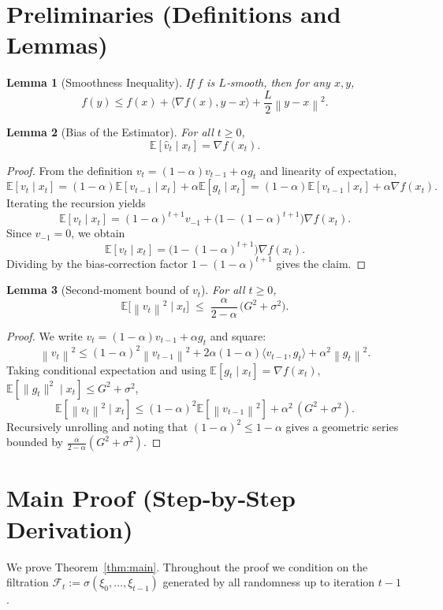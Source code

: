 \documentclass{article}
\newtheorem{lemma}{Lemma}
\newcommand{\E}{\mathbb{E}}
\newcommand{\norm}[1]{\left\lVert#1\right\rVert}
\begin{document}
\section*{Preliminaries (Definitions and Lemmas)}
\begin{lemma}[Smoothness Inequality]\label{lem:smooth}
If $f$ is $L$‑smooth, then for any $x,y$,
\[
f(y)\le f(x)+\langle\nabla f(x),y-x\rangle+\frac{L}{2}\norm{y-x}^2 .
\]
\end{lemma}
\begin{lemma}[Bias of the Estimator]\label{lem:bias}
For all $t\ge0$,
\[
\E[\hat v_t\mid x_t]=\nabla f(x_t).
\]
\end{lemma}
\begin{proof}
From the definition $v_t=(1-\alpha)v_{t-1}+\alpha g_t$ and linearity of expectation,
\[
\E[v_t\mid x_t]=(1-\alpha)\E[v_{t-1}\mid x_t]+\alpha\E[g_t\mid x_t]
=(1-\alpha)\E[v_{t-1}\mid x_t]+\alpha\nabla f(x_t).
\]
Iterating the recursion yields
\[
\E[v_t\mid x_t]=(1-\alpha)^{t+1}v_{-1}
+\bigl(1-(1-\alpha)^{t+1}\bigr)\nabla f(x_t).
\]
Since $v_{-1}=0$, we obtain
\[
\E[v_t\mid x_t]=\bigl(1-(1-\alpha)^{t+1}\bigr)\nabla f(x_t).
\]
Dividing by the bias‑correction factor $1-(1-\alpha)^{t+1}$ gives the claim.  \qedhere
\end{proof}
\begin{lemma}[Second‑moment bound of $v_t$]\label{lem:second}
For all $t\ge0$,
\[
\E\!\bigl[\norm{v_t}^2\mid x_t\bigr]\;\le\;
\frac{\alpha}{2-\alpha}\,\bigl(G^2+\sigma^2\bigr).
\]
\end{lemma}
\begin{proof}
We write $v_t=(1-\alpha)v_{t-1}+\alpha g_t$ and square:
\[
\norm{v_t}^2\le(1-\alpha)^2\norm{v_{t-1}}^2+2\alpha(1-\alpha)\langle v_{t-1},g_t\rangle+\alpha^2\norm{g_t}^2 .
\]
Taking conditional expectation and using $\E[g_t\mid x_t]=\nabla f(x_t)$, $\E[\|g_t\|^2\mid x_t]\le G^2+\sigma^2$,
\[
\E[\norm{v_t}^2\mid x_t]\le (1-\alpha)^2\E[\norm{v_{t-1}}^2]+ \alpha^2\,(G^2+\sigma^2).
\]
Recursively unrolling and noting that $(1-\alpha)^2\le 1-\alpha$ gives a geometric series bounded by $\frac{\alpha}{2-\alpha}(G^2+\sigma^2)$.  \qedhere
\end{proof}

\section*{Main Proof (Step‑by‑Step Derivation)}
We prove Theorem~\ref{thm:main}.  Throughout the proof we condition on the filtration $\mathcal{F}_t:=\sigma(\xi_0,\dots,\xi_{t-1})$ generated by all randomness up to iteration $t-1$.
\end{document}
